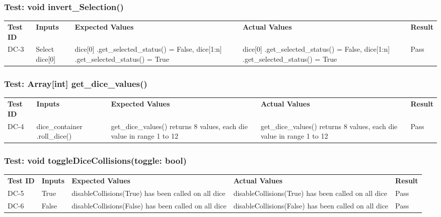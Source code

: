 \documentclass[12pt, titlepage]{article}
\begin{document}
\subsubsection{Test: void invert\_Selection()}
\begin{tabularx}{\textwidth}{|p{2cm}|p{3.5cm}|p{4cm}|p{4cm}|p{1.5cm}|}
    \cline{1-5}
    \textbf{Test ID} & \textbf{Inputs} & \textbf{Expected Values} & \textbf{Actual Values} & \textbf{Result} \\
    \cline{1-5}
    DC-3 & Select dice[0] & dice[0] .get\_selected\_status() = False, dice[1:n] .get\_selected\_status() = True & dice[0] .get\_selected\_status() = False, dice[1:n] .get\_selected\_status() = True & Pass \\
    \cline{1-5}
\end{tabularx}

\subsubsection{Test: Array[int] get\_dice\_values()}
\begin{tabularx}{\textwidth}{|p{2cm}|p{3.5cm}|p{4cm}|p{4cm}|p{1.5cm}|}
    \cline{1-5}
    \textbf{Test ID} & \textbf{Inputs} & \textbf{Expected Values} & \textbf{Actual Values} & \textbf{Result} \\
    \cline{1-5}
    DC-4 & dice\_container .roll\_dice() & get\_dice\_values() returns 8 values, each die value in range 1 to 12 & get\_dice\_values() returns 8 values, each die value in range 1 to 12 & Pass \\
    \cline{1-5}
\end{tabularx}

\subsubsection{Test: void toggleDiceCollisions(toggle: bool)}
\begin{tabularx}{\textwidth}{|p{2cm}|p{3.5cm}|p{4cm}|p{4cm}|p{1.5cm}|}
    \cline{1-5}
    \textbf{Test ID} & \textbf{Inputs} & \textbf{Expected Values} & \textbf{Actual Values} & \textbf{Result} \\
    \cline{1-5}
    DC-5 & True & disableCollisions(True) has been called on all dice & disableCollisions(True) has been called on all dice & Pass \\
    \cline{1-5}
    DC-6 & False & disableCollisions(False) has been called on all dice & disableCollisions(False) has been called on all dice & Pass \\
    \cline{1-5}
\end{tabularx}
\end{document}
